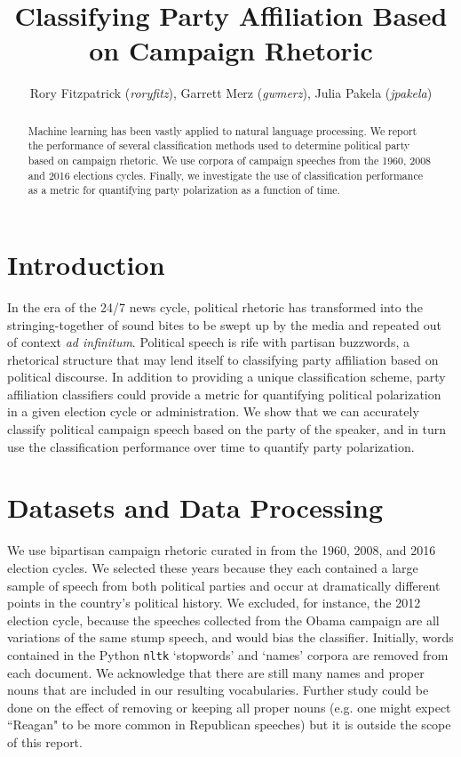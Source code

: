 \documentclass[aps, prl, reprint, showpacs]{revtex4-1}
\begin{document}
\title{Classifying Party Affiliation Based on Campaign Rhetoric}

\author{Rory Fitzpatrick (\textit{roryfitz}), Garrett Merz (\textit{gwmerz}), Julia Pakela (\textit{jpakela})}

\begin{abstract}
\noindent Machine learning has been vastly applied to natural language processing. We report the performance of several classification methods used to determine political party based on campaign rhetoric. We use corpora of campaign speeches from the 1960, 2008 and 2016 elections cycles. Finally, we investigate the use of classification performance as a metric for quantifying party polarization as a function of time.
\end{abstract}


\maketitle

\section{Introduction}
In the era of the 24/7 news cycle, political rhetoric has transformed into the stringing-together of sound bites to be swept up by the media and repeated out of context \textit{ad infinitum}. Political speech is rife with partisan buzzwords, a rhetorical structure that may lend itself to classifying party affiliation based on political discourse. In addition to providing a unique classification scheme, party affiliation classifiers could provide a metric for quantifying political polarization in a given election cycle or administration. We show that we can accurately classify political campaign speech based on the party of the speaker, and in turn use the classification performance over time to quantify party polarization. 

\section{Datasets and Data Processing}
We use bipartisan campaign rhetoric curated in \cite{peters} from the 1960, 2008, and 2016 election cycles. We selected these years because they each contained a large sample of speech from both political parties and occur at dramatically different points in the country's political history. We excluded, for instance, the 2012 election cycle, because the speeches collected from the Obama campaign are all variations of the same stump speech, and would bias the classifier. Initially, words contained in the  Python \texttt{nltk} `stopwords' and `names' corpora are removed from each document. We acknowledge that there are still many names and proper nouns that are included in our resulting vocabularies. Further study could be done on the effect of removing or keeping all proper nouns (e.g. one might expect ``Reagan" to be more common in Republican speeches) but it is outside the scope of this report.
\end{document}
